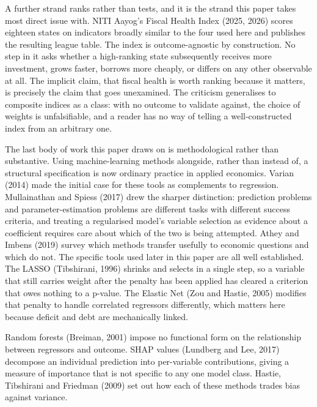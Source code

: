 \documentclass[12pt,a4paper]{article}
\begin{document}
A further strand ranks rather than tests, and it is the strand this paper takes most direct issue with. NITI Aayog's Fiscal Health Index (2025, 2026) scores eighteen states on indicators broadly similar to the four used here and publishes the resulting league table. The index is outcome-agnostic by construction. No step in it asks whether a high-ranking state subsequently receives more investment, grows faster, borrows more cheaply, or differs on any other observable at all. The implicit claim, that fiscal health is worth ranking because it matters, is precisely the claim that goes unexamined. The criticism generalises to composite indices as a class: with no outcome to validate against, the choice of weights is unfalsifiable, and a reader has no way of telling a well-constructed index from an arbitrary one.

The last body of work this paper draws on is methodological rather than substantive. Using machine-learning methods alongside, rather than instead of, a structural specification is now ordinary practice in applied economics. Varian (2014) made the initial case for these tools as complements to regression. Mullainathan and Spiess (2017) drew the sharper distinction: prediction problems and parameter-estimation problems are different tasks with different success criteria, and treating a regularised model's variable selection as evidence about a coefficient requires care about which of the two is being attempted. Athey and Imbens (2019) survey which methods transfer usefully to economic questions and which do not. The specific tools used later in this paper are all well established. The LASSO (Tibshirani, 1996) shrinks and selects in a single step, so a variable that still carries weight after the penalty has been applied has cleared a criterion that owes nothing to a p-value. The Elastic Net (Zou and Hastie, 2005) modifies that penalty to handle correlated regressors differently, which matters here because deficit and debt are mechanically linked.

Random forests (Breiman, 2001) impose no functional form on the relationship between regressors and outcome. SHAP values (Lundberg and Lee, 2017) decompose an individual prediction into per-variable contributions, giving a measure of importance that is not specific to any one model class. Hastie, Tibshirani and Friedman (2009) set out how each of these methods trades bias against variance.
\end{document}
